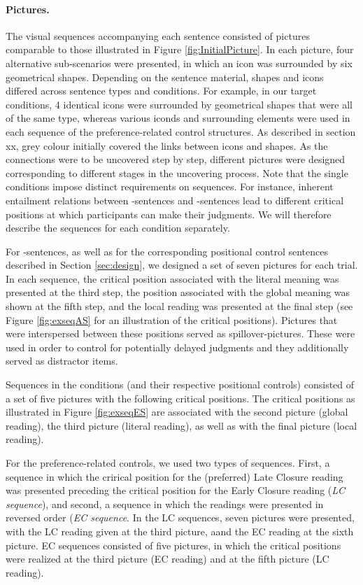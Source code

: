 \documentclass[fleqn,reqno,10pt,draft]{article}
\newcommand{\as}{\acro{as}}
\renewcommand{\es}{\acro{es}}
\begin{document}
\paragraph{Pictures.}
The visual sequences accompanying each sentence consisted of pictures comparable to those illustrated in Figure \ref{fig:InitialPicture}. In each picture, four alternative sub-scenarios were presented, in which an icon was surrounded by six geometrical shapes. Depending on the sentence material, shapes and icons differed across sentence types and conditions. For example, in our target conditions, 4 identical icons were surrounded by geometrical shapes that were all of the same type, whereas various iconds and surrounding elements were used in each sequence of the preference-related control structures. As described in section xx, grey colour initially covered the links between icons and shapes. As the connections were to be uncovered step by step, different pictures were designed corresponding to different stages in the uncovering process. Note that the single conditions impose distinct requirements on sequences. For instance, inherent entailment relations between \as-sentences and \es-sentences lead to different critical positions at which participants can make their judgments. We will therefore describe the sequences for each condition separately.

For \as-sentences, as well as for the corresponding positional control sentences described in Section \ref{sec:design}, we designed a set of seven pictures for each trial. In each sequence, the critical position associated with the literal meaning was presented at the third step, the position associated with the global meaning was shown at the fifth step, and the local reading was presented at the final step (see Figure \ref{fig:exseqAS} for an illustration of the critical positions). Pictures that were interspersed between these positions served as spillover-pictures. These were used in order to control for potentially delayed judgments and they additionally served as distractor items.

Sequences in the \es conditions (and their respective positional controls) consisted of a set of five pictures with the following critical positions. The critical positions as illustrated in Figure \ref{fig:exseqES} are associated with the second picture (global reading), the third picture (literal reading), as well as with the final picture (local reading). 

For the preference-related controls, we used two types of sequences. First, a sequence in which the crirical position for the (preferred) Late Closure reading was presented preceding the critical position for the Early Closure reading ({\it LC sequence}), and second, a sequence in which the readings were presented in reversed order ({\it EC sequence}. In the LC sequences, seven pictures were presented, with the LC reading given at the third picture, aand the EC reading at the sixth picture. EC sequences consisted of five pictures, in which the critical positions were realized at the third picture (EC reading) and at the fifth picture (LC reading). 
\end{document}
